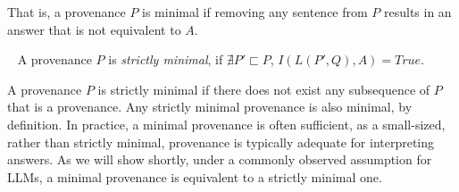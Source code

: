 \noindent That is, a provenance $P$ is minimal if removing any sentence from $P$ results in an answer that is not equivalent to $A$. 

\begin{definition}
    ~\label{def:strict-minimal-provenance} A provenance $P$ is {\em strictly minimal}, if $\nexists P' \sqsubset P$,  $I(L(P', Q), A) = True$.
\end{definition}

\noindent A provenance $P$ is strictly minimal if there does not exist any subsequence of $P$ that is a provenance. Any strictly minimal provenance is also minimal, by definition. 
In practice, a minimal provenance is often sufficient, as a small-sized, rather than strictly minimal, provenance is typically adequate
for interpreting answers. 
As we will show shortly, under a commonly 
observed assumption for LLMs, 
a minimal provenance is equivalent to a strictly minimal one. 


\begin{table}[bt]
\small 
\centering
{}
\caption{} 
\label{tab:llm-as-a-judge}
\vspace{-3em}
\end{table}








\vspace{-1mm}
